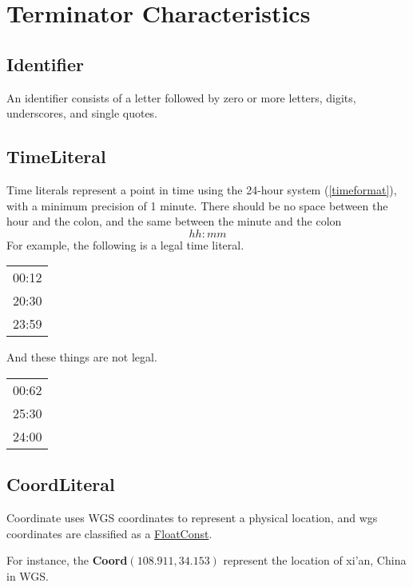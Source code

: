\section{Terminator Characteristics}
\subsection{Identifier}\label{Identifier}
An identifier consists of a letter followed by zero or more letters, digits, underscores, and single quotes.
\begin{grammar}
    \emptyStm
        \orStm{\texttt{[0-9]}}
\end{grammar}

\subsection{TimeLiteral}\label{TimeLiteral}
Time literals represent a point in time using the 24-hour system (\ref{timeformat}), with a minimum precision of 1 minute.
There should be no space between the hour and the colon, and the same between the minute and the colon
\begin{equation}\label{timeformat}
    hh:mm
\end{equation}
For example, the following is a legal time literal.

\begin{center}
    \begin{tabular}{c}
        00:12 \\
        20:30 \\
        23:59 \\
    \end{tabular}
\end{center}
And these things are not legal.

\begin{center}
    \begin{tabular}{c}
        00:62 \\
        25:30 \\
        24:00 \\
    \end{tabular}
\end{center}

\subsection{CoordLiteral} \label{CoordLiteral}
Coordinate uses WGS coordinates to represent a physical location, and wgs coordinates are classified as a \hyperref[FloatConst]{FloatConst}.
\begin{grammar}
\end{grammar}
For instance, the \textbf{Coord}$(108.911, 34.153)$ represent the location of  xi'an, China in WGS.

